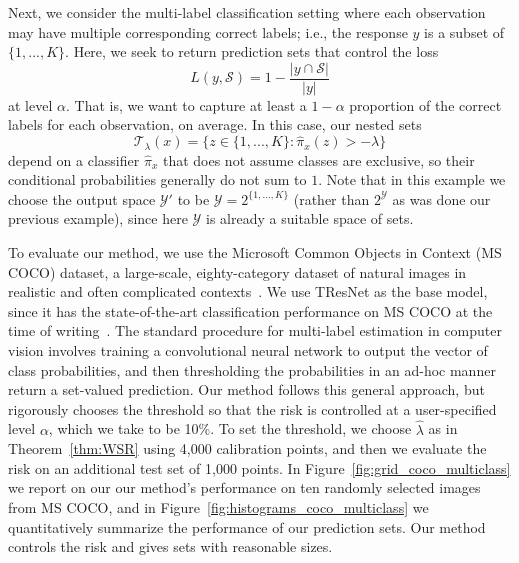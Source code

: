 \documentclass[10pt]{article}
\newcommand{\Y}{\mathcal{Y}}
\newcommand{\T}{\mathcal{T}}
\renewcommand{\S}{\mathcal{S}}
\newcommand{\lhat}{\hat{\lambda}}
\begin{document}
Next, we consider the multi-label classification setting where each observation may have multiple corresponding correct labels; i.e., the response $y$ is a subset of $\{1,...,K\}$. 
Here, we seek to return prediction sets that control the loss
\begin{equation}
\label{eq:multiclass-loss}
L(y, \S) = 1 - \frac{|y \cap \S|}{|y|}
\end{equation}
at level $\alpha$. That is, we want to capture at least a $1-\alpha$ proportion of the correct labels for each observation, on average.
In this case, our nested sets
\begin{equation}
    \T_\lambda(x) = \big\{z \in \{1,...,K\} :\hat{\pi}_x(z) > -\lambda\big\}
\end{equation}
depend on a classifier $\hat{\pi}_x$ that does not assume classes are exclusive, so their conditional probabilities generally do not sum to $1$. 
Note that in this example we choose the output space $\Y'$ to be $\Y = 2^{\{1,\dots,K\}}$ (rather than $2^\Y$ as was done our previous example), since here $\Y$ is already a suitable space of sets.

To evaluate our method, we use the Microsoft Common Objects in Context (MS COCO) dataset, a large-scale, eighty-category dataset of natural images in realistic and often complicated contexts~\cite{lin2014microsoft}.
We use TResNet as the base model, since it has the state-of-the-art classification performance on MS COCO at the time of writing~\cite{ridnik2020tresnet}.
The standard procedure for multi-label estimation in computer vision involves training a convolutional neural network to output the vector of class probabilities, and then thresholding the probabilities in an ad-hoc manner return a set-valued prediction.
Our method follows this general approach, but rigorously chooses the threshold so that the risk is controlled at a user-specified level $\alpha$, which we take to be 10\%. To set the threshold, we choose $\lhat$ as in Theorem~\ref{thm:WSR} using 4,000 calibration points, and then we evaluate the risk on an additional test set of 1,000 points.
In Figure~\ref{fig:grid_coco_multiclass} we report on our our method's performance on ten randomly selected images from MS COCO, and in Figure~\ref{fig:histograms_coco_multiclass} we quantitatively summarize the performance of our prediction sets.
Our method controls the risk and gives sets with reasonable sizes.
\end{document}
